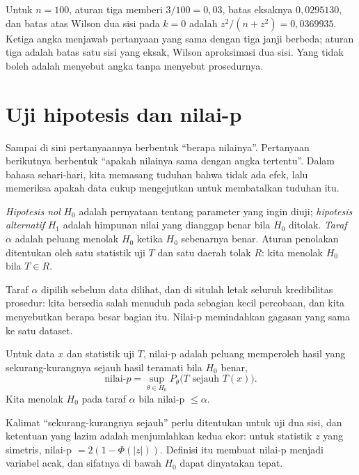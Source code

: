 Untuk $n=100$, aturan tiga memberi $3/100=0{,}03$, batas eksaknya $0{,}0295130$, dan
batas atas Wilson dua sisi pada $k=0$ adalah $z^2/(n+z^2)=0{,}0369935$. Ketiga angka
menjawab pertanyaan yang sama dengan tiga janji berbeda; aturan tiga adalah batas satu
sisi yang eksak, Wilson aproksimasi dua sisi. Yang tidak boleh adalah menyebut angka
tanpa menyebut prosedurnya.

\section{Uji hipotesis dan nilai-p}

Sampai di sini pertanyaannya berbentuk ``berapa nilainya''. Pertanyaan berikutnya
berbentuk ``apakah nilainya sama dengan angka tertentu''. Dalam bahasa sehari-hari,
kita memasang tuduhan bahwa tidak ada efek, lalu memeriksa apakah data cukup
mengejutkan untuk membatalkan tuduhan itu.

\begin{definisi}
\emph{Hipotesis nol} $H_0$ adalah pernyataan tentang parameter yang ingin diuji;
\emph{hipotesis alternatif} $H_1$ adalah himpunan nilai yang dianggap benar bila $H_0$
ditolak. \emph{Taraf} $\alpha$ adalah peluang menolak $H_0$ ketika $H_0$ sebenarnya
benar. Aturan penolakan ditentukan oleh satu statistik uji $T$ dan satu daerah tolak
$R$: kita menolak $H_0$ bila $T\in R$.
\end{definisi}

Taraf $\alpha$ dipilih sebelum data dilihat, dan di situlah letak seluruh
kredibilitas prosedur: kita bersedia salah menuduh pada sebagian kecil percobaan, dan
kita menyebutkan berapa besar bagian itu. Nilai-p memindahkan gagasan yang sama ke
satu dataset.

\begin{definisi}[Nilai-p]
Untuk data $x$ dan statistik uji $T$, nilai-p adalah peluang memperoleh hasil yang
sekurang-kurangnya sejauh hasil teramati bila $H_0$ benar,
\[
\text{nilai-}p=\sup_{\theta\in H_0}P_\theta\bigl(T\text{ sejauh }T(x)\bigr).
\]
Kita menolak $H_0$ pada taraf $\alpha$ bila nilai-p $\le\alpha$.
\end{definisi}

Kalimat ``sekurang-kurangnya sejauh'' perlu ditentukan untuk uji dua sisi, dan
ketentuan yang lazim adalah menjumlahkan kedua ekor: untuk statistik $z$ yang
simetris, nilai-p $=2(1-\Phi(|z|))$. Definisi itu membuat nilai-p menjadi variabel
acak, dan sifatnya di bawah $H_0$ dapat dinyatakan tepat.

